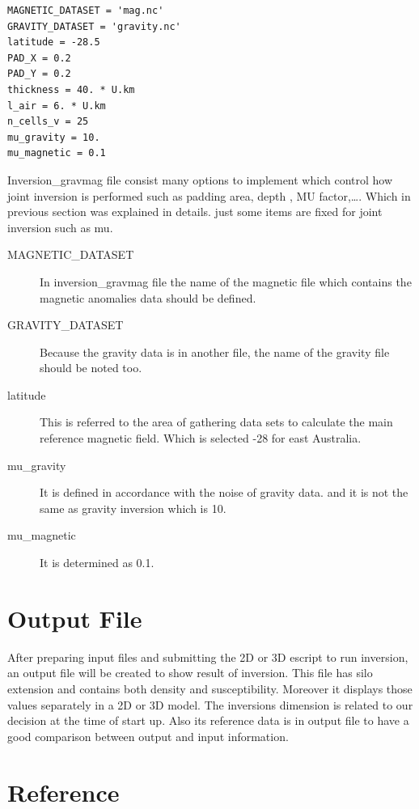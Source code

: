 \begin{verbatim}
MAGNETIC_DATASET = 'mag.nc'
GRAVITY_DATASET = 'gravity.nc'
latitude = -28.5
PAD_X = 0.2
PAD_Y = 0.2
thickness = 40. * U.km
l_air = 6. * U.km
n_cells_v = 25
mu_gravity = 10.
mu_magnetic = 0.1
\end{verbatim}

Inversion_gravmag file consist many options to implement which control how joint inversion is performed such as padding area, depth , MU factor,\ldots. Which in previous section was explained in details. just some items are fixed for joint inversion such as mu.


\begin{description} 
\item[MAGNETIC_DATASET]In inversion_gravmag file the name of the magnetic file which contains the magnetic anomalies data should be defined.

\item[GRAVITY_DATASET]Because the gravity data is in another file, the name of the gravity file should be noted too.
	
\item[latitude]This is referred to the area of gathering data sets to calculate the main reference magnetic field. Which is selected -28 for east Australia.


\item[mu_gravity]It is defined in accordance with the noise of gravity data. and it is not the same as gravity inversion which is 10.

\item[mu_magnetic]It is determined as 0.1.

\end{description}


\section{Output File}

After preparing input files and submitting the 2D or 3D escript to run inversion, an output file will be created to show result of inversion. This file has silo extension and contains both density and susceptibility. Moreover it displays those values separately in a 2D or 3D model. The inversions dimension is related to our decision at the time of start up. Also its reference data is in output file to have a good comparison between output and input information.

\section{Reference}

